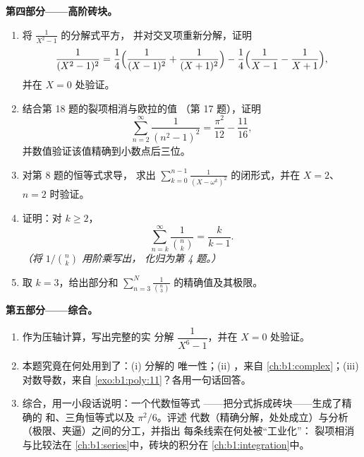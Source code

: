 \begin{problem}
\medskip
\noindent\textbf{第四部分——高阶砖块。}
\begin{enumerate}[resume]
  \item 将 $\frac1{X^2-1}$ 的分解式平方，
        并对交叉项重新分解，证明
        \[
        \frac1{(X^2-1)^2}
        = \frac14\Bigl(\frac1{(X-1)^2} + \frac1{(X+1)^2}\Bigr)
        - \frac14\Bigl(\frac1{X-1} - \frac1{X+1}\Bigr),
        \]
        并在 $X = 0$ 处验证。
  \item 结合第 18 题的裂项相消与欧拉的值
        （第 17 题），证明
        \[
        \sum_{n=2}^{\infty}\frac1{(n^2-1)^2}
        = \frac{\pi^2}{12} - \frac{11}{16} ,
        \]
        并数值验证该值精确到小数点后三位。
  \item 对第 8 题的恒等式求导，
        求出 $\sum_{k=0}^{n-1}\frac1{(X -
        \omega^k)^2}$ 的闭形式，并在 $X = 2$、$n = 2$ 时验证。
  \item 证明：对 $k \geq 2$，
        \[
        \sum_{n=k}^{\infty}\frac{1}{\binom nk} = \frac{k}{k-1} .
        \]
        \emph{（将 $1/\binom nk$ 用阶乘写出，
        化归为第 4 题。）}
  \item 取 $k = 3$，给出部分和
        $\sum_{n=3}^{N}\frac1{\binom n3}$ 的精确值及其极限。
\end{enumerate}

\medskip
\noindent\textbf{第五部分——综合。}
\begin{enumerate}[resume]
  \item 作为压轴计算，写出完整的实
        分解 $\dfrac1{X^6 - 1}$，并在 $X =
        0$ 处验证。
  \item 本题究竟在何处用到了：(i) 分解的
        唯一性；(ii) ，来自
        \cref{ch:b1:complex}；(iii) 对数导数，来自
        \cref{exo:b1:poly:11}？各用一句话回答。
  \item 综合，用一小段话说明：一个代数恒等式
        ——把分式拆成砖块——生成了精确的
        和、三角恒等式以及 $\pi^2/6$。评述
        代数（精确分解，处处成立）与分析
        （极限、夹逼）之间的分工，并指出
        每条线索在何处被“工业化”：
        裂项相消与比较法在
        \cref{ch:b1:series}中，砖块的积分在
        \cref{ch:b1:integration}中。
\end{enumerate}
\end{problem}
